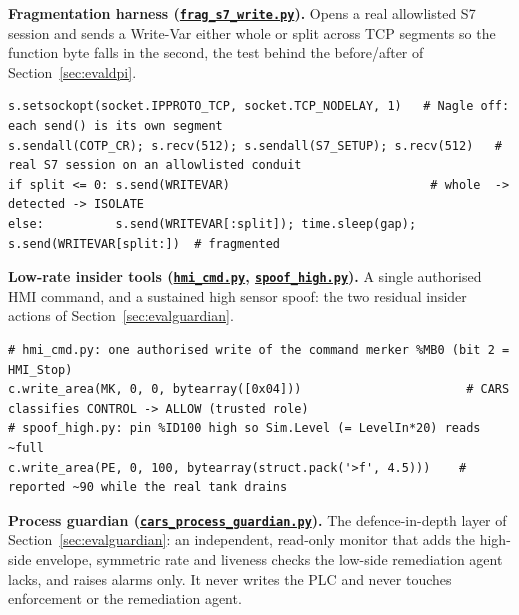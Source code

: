 \noindent \textbf{Fragmentation harness (\href{\repourl/blob/main/report/gap_evidence/gap_evidence/scripts/frag_s7_write.py}{\texttt{frag\_s7\_write.py}}).} Opens a real allowlisted S7 session and sends a Write-Var either whole or split across TCP segments so the function byte falls in the second, the test behind the before/after of Section~\ref{sec:evaldpi}.

\begin{lstlisting}[style=carssrc,caption={Sending the Write-Var whole or split at byte N (0x05 pushed into the second segment).},label={lst:frag}]
s.setsockopt(socket.IPPROTO_TCP, socket.TCP_NODELAY, 1)   # Nagle off: each send() is its own segment
s.sendall(COTP_CR); s.recv(512); s.sendall(S7_SETUP); s.recv(512)   # real S7 session on an allowlisted conduit
if split <= 0: s.send(WRITEVAR)                            # whole  -> detected -> ISOLATE
else:          s.send(WRITEVAR[:split]); time.sleep(gap); s.send(WRITEVAR[split:])  # fragmented
\end{lstlisting}

\noindent \textbf{Low-rate insider tools (\href{\repourl/blob/main/report/gap_evidence/gap_evidence/scripts/hmi_cmd.py}{\texttt{hmi\_cmd.py}}, \href{\repourl/blob/main/report/gap_evidence/gap_evidence/scripts/spoof_high.py}{\texttt{spoof\_high.py}}).} A single authorised HMI command, and a sustained high sensor spoof: the two residual insider actions of Section~\ref{sec:evalguardian}.

\begin{lstlisting}[style=carssrc,caption={One authorised HMI stop; and pinning the level sensor high.},label={lst:insider}]
# hmi_cmd.py: one authorised write of the command merker %MB0 (bit 2 = HMI_Stop)
c.write_area(MK, 0, 0, bytearray([0x04]))                       # CARS classifies CONTROL -> ALLOW (trusted role)
# spoof_high.py: pin %ID100 high so Sim.Level (= LevelIn*20) reads ~full
c.write_area(PE, 0, 100, bytearray(struct.pack('>f', 4.5)))    # reported ~90 while the real tank drains
\end{lstlisting}

\noindent \textbf{Process guardian (\href{\repourl/blob/main/report/gap_evidence/gap_evidence/scripts/cars_process_guardian.py}{\texttt{cars\_process\_guardian.py}}).} The defence-in-depth layer of Section~\ref{sec:evalguardian}: an independent, read-only monitor that adds the high-side envelope, symmetric rate and liveness checks the low-side remediation agent lacks, and raises alarms only. It never writes the PLC and never touches enforcement or the remediation agent.

